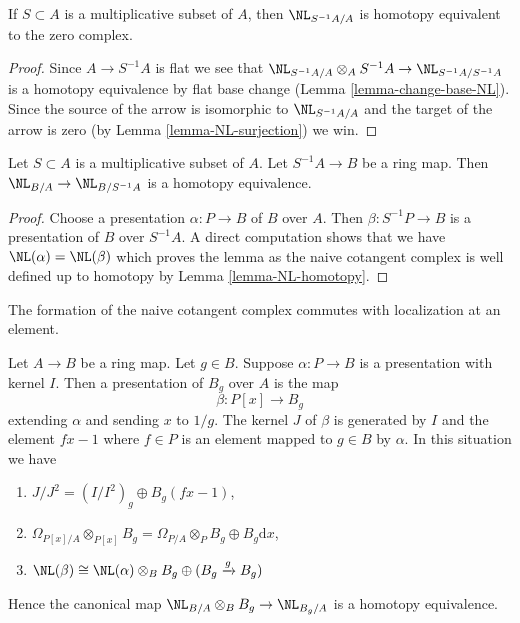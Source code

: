 \begin{lemma}
\label{lemma-NL-of-localization}
If $S \subset A$ is a multiplicative subset of $A$, then
$\NL_{S^{-1}A/A}$ is homotopy equivalent to the zero complex.
\end{lemma}

\begin{proof}
Since $A \to S^{-1}A$ is flat we see that
$\NL_{S^{-1}A/A} \otimes_A S^{-1}A \to \NL_{S^{-1}A/S^{-1}A}$
is a homotopy equivalence by flat base change
(Lemma \ref{lemma-change-base-NL}). Since the source of the arrow
is isomorphic to $\NL_{S^{-1}A/A}$ and the target of the arrow is
zero (by Lemma \ref{lemma-NL-surjection}) we win.
\end{proof}

\begin{lemma}
\label{lemma-NL-localize-bottom}
Let $S \subset A$ is a multiplicative subset of $A$.
Let $S^{-1}A \to B$ be a ring map.
Then $\NL_{B/A} \to \NL_{B/S^{-1}A}$ is a homotopy equivalence.
\end{lemma}

\begin{proof}
Choose a presentation $\alpha : P \to B$ of $B$ over $A$.
Then $\beta : S^{-1}P \to B$ is a presentation of $B$ over $S^{-1}A$.
A direct computation shows that we have $\NL(\alpha) = \NL(\beta)$
which proves the lemma as the naive cotangent complex is well defined
up to homotopy by Lemma \ref{lemma-NL-homotopy}.
\end{proof}

\begin{lemma}
\label{lemma-principal-localization-NL}
\begin{slogan}
The formation of the naive cotangent complex commutes with localization
at an element.
\end{slogan}
Let $A \to B$ be a ring map. Let $g \in B$. Suppose $\alpha : P \to B$
is a presentation with kernel $I$. Then a presentation of $B_g$ over $A$ is
the map
$$
\beta : P[x] \longrightarrow B_g
$$
extending $\alpha$ and sending $x$ to $1/g$.
The kernel $J$ of $\beta$ is generated by $I$ and the element $f x - 1$
where $f \in P$ is an element mapped to $g \in B$ by $\alpha$. In this
situation we have
\begin{enumerate}
\item $J/J^2 = (I/I^2)_g \oplus B_g (f x - 1)$,
\item $\Omega_{P[x]/A} \otimes_{P[x]} B_g =
\Omega_{P/A} \otimes_P B_g \oplus B_g \text{d}x$,
\item $\NL(\beta) \cong
\NL(\alpha) \otimes_B B_g \oplus (B_g \xrightarrow{g} B_g)$
\end{enumerate}
Hence the canonical map $\NL_{B/A} \otimes_B B_g \to \NL_{B_g/A}$
is a homotopy equivalence.
\end{lemma}

